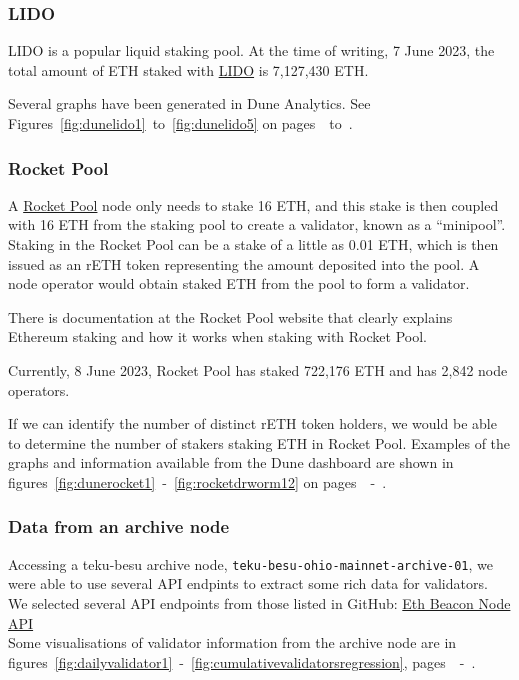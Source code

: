 \documentclass[UTF8]{article}
\begin{document}
\subsubsection*{LIDO}
LIDO is a popular liquid staking pool. 
At the time of writing, 7 June 2023, the total amount of ETH staked with \href{https://lido.fi/ethereum}{LIDO}  is 7,127,430 ETH. 

Several graphs have been generated in Dune Analytics. See Figures~\ref{fig:dunelido1}~to~\ref{fig:dunelido5} on pages~\pageref{fig:dunelido1}~to~\pageref{fig:dunelido5}.


\subsubsection*{Rocket Pool}
A \href{https://rocketpool.net/}{Rocket Pool} node only needs to stake 16 ETH, and this stake is then coupled with 16 ETH from the staking pool to create a validator, known as a ``minipool''.  Staking in the Rocket Pool can be a stake of a little as 0.01 ETH, which is then issued as an rETH token representing the amount deposited into the pool. A node operator would obtain staked ETH from the pool to form a validator.

There is documentation at the Rocket Pool website that clearly explains Ethereum staking and how it works when staking with Rocket Pool.

Currently, 8 June 2023, Rocket Pool has staked 722,176 ETH and has 2,842 node operators.

If we can identify the number of distinct rETH token holders, we would be able to determine the number of stakers staking ETH in Rocket Pool. 
Examples of the graphs and information available from the Dune dashboard are shown in figures~\ref{fig:dunerocket1}~-~\ref{fig:rocketdrworm12} on pages~\pageref{fig:dunerocket1}~-~\pageref{fig:rocketdrworm12}.

\subsubsection*{Data from an archive node}
Accessing a teku-besu archive node, \texttt{teku-besu-ohio-mainnet-archive-01},  we were able to use several API endpints to extract some rich data for validators.\\
	 We selected several API endpoints from those listed in GitHub: \href{https://ethereum.github.io/beacon-APIs/?urls.primaryName=dev}{Eth Beacon Node API}\\
	 Some visualisations of validator information from the archive node are in figures~\ref{fig:dailyvalidator1}~-~\ref{fig:cumulativevalidatorsregression}, pages~\pageref{fig:dailyvalidator1}~-~\pageref{fig:cumulativevalidatorsregression}.
	 
\end{document}
